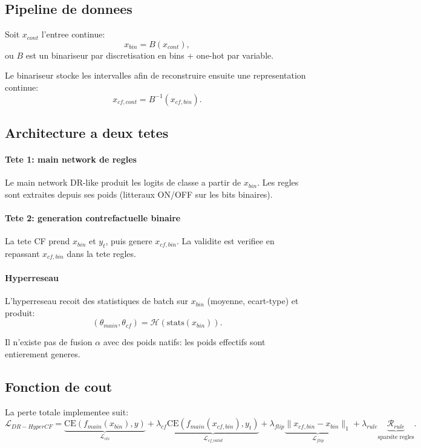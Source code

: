 \documentclass[11pt,a4paper]{article}
\begin{document}
\subsection{Pipeline de donnees}
Soit $x_{cont}$ l'entree continue:
\begin{equation}
x_{bin} = B(x_{cont}),
\end{equation}
ou $B$ est un binariseur par discretisation en bins + one-hot par variable.

Le binariseur stocke les intervalles afin de reconstruire ensuite une representation continue:
\begin{equation}
x_{cf,cont}=B^{-1}(x_{cf,bin}).
\end{equation}

\subsection{Architecture a deux tetes}
\paragraph{Tete 1: main network de regles}
Le main network DR-like produit les logits de classe a partir de $x_{bin}$.
Les regles sont extraites depuis ses poids (litteraux ON/OFF sur les bits binaires).

\paragraph{Tete 2: generation contrefactuelle binaire}
La tete CF prend $x_{bin}$ et $y_t$, puis genere $x_{cf,bin}$.
La validite est verifiee en repassant $x_{cf,bin}$ dans la tete regles.

\paragraph{Hyperreseau}
L'hyperreseau recoit des statistiques de batch sur $x_{bin}$ (moyenne, ecart-type) et produit:
\begin{equation}
(\theta_{main},\theta_{cf}) = \mathcal{H}(\text{stats}(x_{bin})).
\end{equation}

Il n'existe pas de fusion $\alpha$ avec des poids natifs: les poids effectifs sont entierement generes.

\subsection{Fonction de cout}
La perte totale implementee suit:
\begin{equation}
\mathcal{L}_{DR-HyperCF}
= \underbrace{\text{CE}(f_{main}(x_{bin}),y)}_{\mathcal{L}_{cls}}
+ \lambda_{cf}\underbrace{\text{CE}(f_{main}(x_{cf,bin}),y_t)}_{\mathcal{L}_{cf\_valid}}
+ \lambda_{flip}\underbrace{\|x_{cf,bin}-x_{bin}\|_1}_{\mathcal{L}_{flip}}
+ \lambda_{rule}\underbrace{\mathcal{R}_{rule}}_{\text{sparsite regles}}.
\end{equation}
\end{document}
